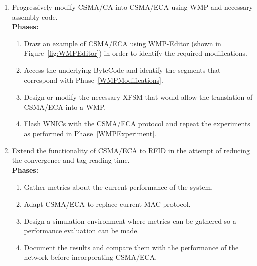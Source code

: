 \begin{enumerate}
	\item Progressively modify CSMA/CA into CSMA/ECA using WMP and necessary assembly code.\label{ECAinWMP}\\
	
	{\bfseries Phases:}
	\begin{enumerate}
		\item Draw an example of CSMA/ECA using WMP-Editor (shown in Figure~\ref{fig:WMPEditor}) in order to identify the required modifications.\label{WMPModifications}
		\item Access the underlying ByteCode and identify the segments that correspond with Phase~\ref{WMPModifications}\label{accessByteCode}.
		\item Design or modify the necessary XFSM that would allow the translation of CSMA/ECA into a WMP.
		\item Flash WNICs with the CSMA/ECA protocol and repeat the experiments as performed in Phase~\ref{WMPExperiment}.\\
	\end{enumerate}

	\item Extend the functionality of CSMA/ECA to RFID in the attempt of reducing the convergence and tag-reading time.\label{ECAinRFID}\\
	
	{\bfseries Phases:}
	\begin{enumerate}
		\item Gather metrics about the current performance of the system.
		\item Adapt CSMA/ECA to replace current MAC protocol.
		\item Design a simulation environment where metrics can be gathered so a performance evaluation can be made. 
		\item Document the results and compare them with the performance of the network before incorporating CSMA/ECA.\\
	\end{enumerate}

\end{enumerate}
